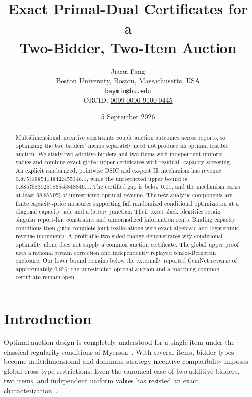\documentclass[11pt]{article}
\title{Exact Primal-Dual Certificates for a\\
Two-Bidder, Two-Item Auction}
\author{Jiarui Fang\\
Boston University, Boston, Massachusetts, USA\\
\texttt{baymin@bu.edu}\\
ORCID: \href{https://orcid.org/0009-0006-9100-0445}{0009-0006-9100-0445}}
\date{5 September 2026}
\begin{document}
\maketitle

\begin{abstract}
Multidimensional incentive constraints couple auction outcomes across reports,
so optimizing the two bidders' menus separately need not produce an optimal
feasible auction. We study two additive bidders and two items with independent
uniform values and combine exact global upper certificates with residual-
capacity screening. An explicit randomized, pointwise DSIC and ex-post IR
mechanism has revenue $0.875819854148422455346\ldots$, while the unrestricted
upper bound is $0.8857583025186545848846\ldots$. The certified gap is below
$0.01$, and the mechanism earns at least $98.8779\%$ of unrestricted optimal
revenue. The new analytic components are finite capacity-price measures
supporting full randomized conditional optimization at a diagonal capacity
hole and a lottery junction. Their exact slack identities retain singular
report-line constraints and unnormalized information rents. Binding capacity
conditions then guide complete joint reallocations with exact algebraic and
logarithmic revenue increments. A profitable two-sided change demonstrates
why conditional optimality alone does not supply a common auction
certificate. The global upper proof uses a rational stream correction and
independently replayed tensor-Bernstein enclosure. Our lower bound remains
below the externally reported GemNet revenue of approximately $0.876$; the
unrestricted optimal auction and a matching common certificate remain open.
\end{abstract}

\section{Introduction}

Optimal auction design is completely understood for a single item under the
classical regularity conditions of Myerson~\citep{myerson1981}.  With several
items, bidder types become multidimensional and dominant-strategy incentive
compatibility imposes global cross-type restrictions.  Even the canonical
case of two additive bidders, two items, and independent uniform values has
resisted an exact characterization~\citep{sandholm2015,jiang2026duality}.
\end{document}
